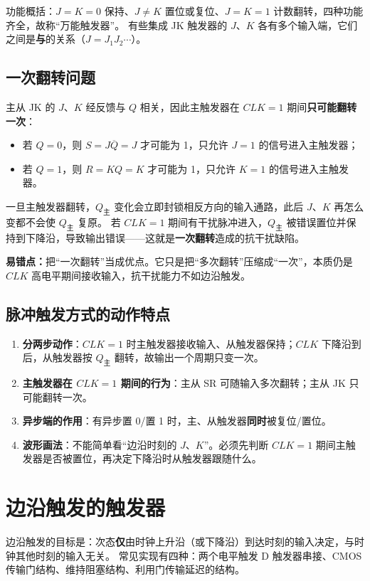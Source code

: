 \noindent 功能概括：$J=K=0$ 保持、$J\neq K$ 置位或复位、$J=K=1$ 计数翻转，四种功能齐全，故称“万能触发器”。
有些集成 JK 触发器的 $J$、$K$ 各有多个输入端，它们之间是\textbf{与}的关系（$J=J_1J_2\cdots$）。

\subsection{一次翻转问题}
主从 JK 的 $J$、$K$ 经反馈与 $Q$ 相关，因此主触发器在 $CLK=1$ 期间\textbf{只可能翻转一次}：
\begin{itemize}
    \item 若 $Q=0$，则 $S=J\overline{Q}=J$ 才可能为 1，只允许 $J=1$ 的信号进入主触发器；
    \item 若 $Q=1$，则 $R=KQ=K$ 才可能为 1，只允许 $K=1$ 的信号进入主触发器。
\end{itemize}

\noindent 一旦主触发器翻转，$Q_{\text{主}}$ 变化会立即封锁相反方向的输入通路，此后 $J$、$K$ 再怎么变都不会使 $Q_{\text{主}}$ 复原。
若 $CLK=1$ 期间有干扰脉冲进入，$Q_{\text{主}}$ 被错误置位并保持到下降沿，导致输出错误——这就是\textbf{一次翻转}造成的抗干扰缺陷。

\noindent\textbf{易错点：}把“一次翻转”当成优点。它只是把“多次翻转”压缩成“一次”，本质仍是 $CLK$ 高电平期间接收输入，抗干扰能力不如边沿触发。

\subsection{脉冲触发方式的动作特点}
\begin{enumerate}
    \item \textbf{分两步动作}：$CLK=1$ 时主触发器接收输入、从触发器保持；$CLK$ 下降沿到后，从触发器按 $Q_{\text{主}}$ 翻转，故输出一个周期只变一次。
    \item \textbf{主触发器在 $CLK=1$ 期间的行为}：主从 SR 可随输入多次翻转；主从 JK 只可能翻转一次。
    \item \textbf{异步端的作用}：有异步置 0/置 1 时，主、从触发器\textbf{同时}被复位/置位。
    \item \textbf{波形画法}：不能简单看“边沿时刻的 $J$、$K$”。必须先判断 $CLK=1$ 期间主触发器是否被置位，再决定下降沿时从触发器跟随什么。
\end{enumerate}

\section{边沿触发的触发器}
\label{sec:edge}
边沿触发的目标是：次态\textbf{仅}由时钟上升沿（或下降沿）到达时刻的输入决定，与时钟其他时刻的输入无关。
常见实现有四种：两个电平触发 D 触发器串接、CMOS 传输门结构、维持阻塞结构、利用门传输延迟的结构。

